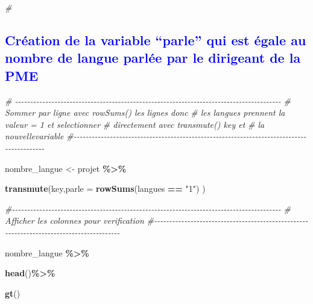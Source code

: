 \documentclass[
]{article}
\newenvironment{Shaded}{\begin{snugshade}}{\end{snugshade}}
\newcommand{\AttributeTok}[1]{\textcolor[rgb]{0.13,0.29,0.53}{#1}}
\newcommand{\CommentTok}[1]{\textcolor[rgb]{0.56,0.35,0.01}{\textit{#1}}}
\newcommand{\FunctionTok}[1]{\textcolor[rgb]{0.13,0.29,0.53}{\textbf{#1}}}
\newcommand{\NormalTok}[1]{#1}
\newcommand{\OtherTok}[1]{\textcolor[rgb]{0.56,0.35,0.01}{#1}}
\newcommand{\SpecialCharTok}[1]{\textcolor[rgb]{0.81,0.36,0.00}{\textbf{#1}}}
\newcommand{\StringTok}[1]{\textcolor[rgb]{0.31,0.60,0.02}{#1}}
\begin{document}
\begin{Shaded}
\begin{Highlighting}[]
\CommentTok{\#}
\end{Highlighting}
\end{Shaded}

\textcolor{blue}{\subsection{Création de la variable “parle” qui est égale au nombre de langue parlée par le dirigeant de la PME}}

\begin{Shaded}
\begin{Highlighting}[]
\CommentTok{\# {-}{-}{-}{-}{-}{-}{-}{-}{-}{-}{-}{-}{-}{-}{-}{-}{-}{-}{-}{-}{-}{-}{-}{-}{-}{-}{-}{-}{-}{-}{-}{-}{-}{-}{-}{-}{-}{-}{-}{-}{-}{-}{-}{-}{-}{-}{-}{-}{-}{-}{-}{-}{-}{-}{-}{-}{-}{-}{-}{-}{-}{-}{-}{-}{-}{-}{-}{-}{-}{-}{-}{-}{-}{-}{-}{-}{-}{-}{-}{-}{-}{-}{-}{-}{-}{-}{-}{-}}
\CommentTok{\#    Sommer par ligne avec rowSums() les lignes donc }
\CommentTok{\#      les langues prennent la valeur = 1 et selectionner}
\CommentTok{\#          directement avec transmute() key et }
\CommentTok{\#               la nouvellevariable}
\CommentTok{\#{-}{-}{-}{-}{-}{-}{-}{-}{-}{-}{-}{-}{-}{-}{-}{-}{-}{-}{-}{-}{-}{-}{-}{-}{-}{-}{-}{-}{-}{-}{-}{-}{-}{-}{-}{-}{-}{-}{-}{-}{-}{-}{-}{-}{-}{-}{-}{-}{-}{-}{-}{-}{-}{-}{-}{-}{-}{-}{-}{-}{-}{-}{-}{-}{-}{-}{-}{-}{-}{-}{-}{-}{-}{-}{-}{-}{-}{-}{-}{-}{-}{-}{-}{-}{-}{-}{-}{-}{-}{-}}

\NormalTok{nombre\_langue }\OtherTok{\textless{}{-}}\NormalTok{ projet }\SpecialCharTok{\%\textgreater{}\%}
  
  \FunctionTok{transmute}\NormalTok{(key,}\AttributeTok{parle =} \FunctionTok{rowSums}\NormalTok{(langues }\SpecialCharTok{==} \StringTok{"1"}\NormalTok{) )}


\CommentTok{\#{-}{-}{-}{-}{-}{-}{-}{-}{-}{-}{-}{-}{-}{-}{-}{-}{-}{-}{-}{-}{-}{-}{-}{-}{-}{-}{-}{-}{-}{-}{-}{-}{-}{-}{-}{-}{-}{-}{-}{-}{-}{-}{-}{-}{-}{-}{-}{-}{-}{-}{-}{-}{-}{-}{-}{-}{-}{-}{-}{-}{-}{-}{-}{-}{-}{-}{-}{-}{-}{-}{-}{-}{-}{-}{-}{-}{-}{-}{-}{-}{-}{-}{-}{-}{-}{-}{-}{-}{-}}
\CommentTok{\#     Afficher les colonnes pour verification}
\CommentTok{\#{-}{-}{-}{-}{-}{-}{-}{-}{-}{-}{-}{-}{-}{-}{-}{-}{-}{-}{-}{-}{-}{-}{-}{-}{-}{-}{-}{-}{-}{-}{-}{-}{-}{-}{-}{-}{-}{-}{-}{-}{-}{-}{-}{-}{-}{-}{-}{-}{-}{-}{-}{-}{-}{-}{-}{-}{-}{-}{-}{-}{-}{-}{-}{-}{-}{-}{-}{-}{-}{-}{-}{-}{-}{-}{-}{-}{-}{-}{-}{-}{-}{-}{-}{-}{-}{-}{-}{-}{-}}

\NormalTok{nombre\_langue }\SpecialCharTok{\%\textgreater{}\%}
  
  \FunctionTok{head}\NormalTok{()}\SpecialCharTok{\%\textgreater{}\%} 
  
  \FunctionTok{gt}\NormalTok{()}
\end{Highlighting}
\end{Shaded}
\end{document}
